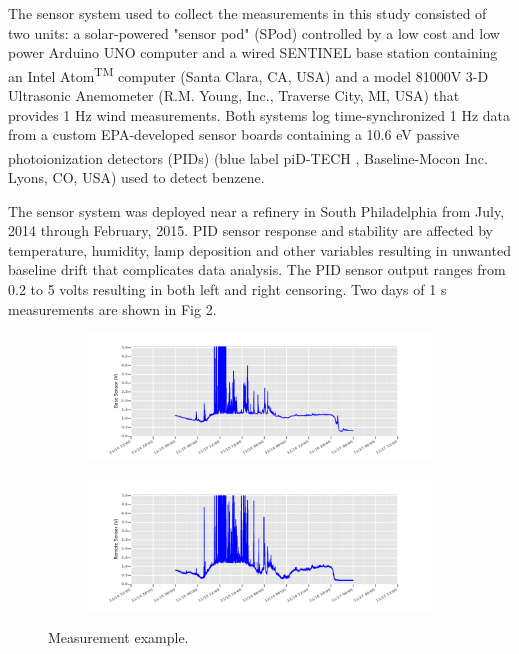\documentclass[fontsize=11pt]{scrartcl} %
\begin{document}
The sensor system used to collect the measurements in this study consisted of two units: a solar-powered "sensor pod" (SPod) controlled by a low cost and low power Arduino UNO computer and a wired SENTINEL base station containing an Intel Atom\textsuperscript{TM} computer (Santa Clara, CA, USA) and a model 81000V 3-D Ultrasonic Anemometer (R.M. Young, Inc., Traverse City, MI, USA) that provides 1 Hz wind measurements. Both systems log time-synchronized 1 Hz data from a custom EPA-developed sensor boards containing a 10.6 eV passive photoionization detectors (PIDs) (blue label piD-TECH \textsuperscript{\textregistered}, Baseline-Mocon Inc. Lyons, CO, USA) used to detect benzene. \cite{wan2015} 
\par The sensor system was deployed near a refinery in South Philadelphia from July, 2014 through February, 2015. PID sensor response and stability are affected by temperature, humidity, lamp deposition and other variables resulting in unwanted baseline drift that complicates data analysis.	The PID sensor output ranges from 0.2 to 5 volts resulting in both left and right censoring. Two days of 1 s measurements are shown in Fig 2.  	
 

\begin{figure}[h!]
	\begin{subfigure}[b]{\textwidth}
	\includegraphics[width=\linewidth]{Base}
	\end{subfigure}
	\begin{subfigure}[b]{\textwidth}
	\includegraphics[width=\linewidth]{Remote}
	\end{subfigure}
	\caption{Measurement example.}
\end{figure}
\end{document}
